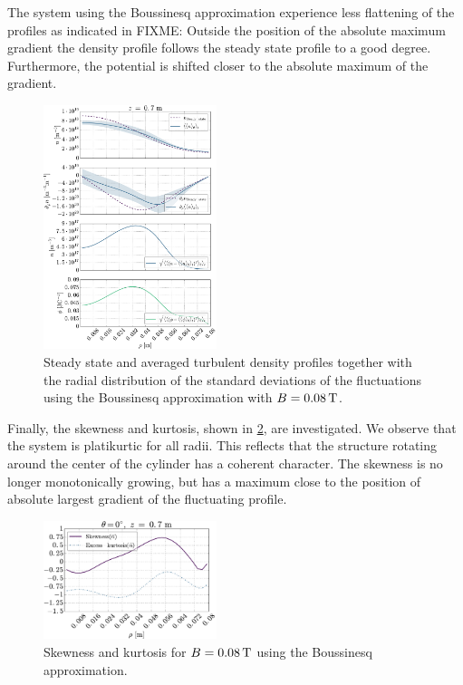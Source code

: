 The system using the Boussinesq approximation experience less flattening of the profiles as indicated in
FIXME:
Outside the position of the absolute maximum gradient the density profile follows the steady state profile to a good degree.
Furthermore, the potential is shifted closer to the absolute maximum of the gradient.
%
\begin{figure}[htb]
    \centering
    \includegraphics[width=0.45\textwidth]{fig/results/compareBouss/fluctProfiles008B}
    \caption{Steady state and averaged turbulent density profiles together with the radial distribution of the standard deviations of the fluctuations using the Boussinesq approximation with $B=0.08\, \text{T}$.}
    \label{fig:posOfFluct008B}
\end{figure}
%
Finally, the skewness and kurtosis, shown in \cref{fig:skewKurt008B}, are investigated.
We observe that the system is platikurtic for all radii.
This reflects that the structure rotating around the center of the cylinder has a coherent character.
The skewness is no longer monotonically growing, but has a maximum close to the position of absolute largest gradient of the fluctuating profile.
%
\begin{figure}[htb]
    \centering
    \includegraphics[width=0.45\textwidth]{fig/results/compareBouss/skewKurt008B}
    \caption{Skewness and kurtosis for $B=0.08\, \text{T}$ using the Boussinesq approximation.}
    \label{fig:skewKurt008B}
\end{figure}
%

